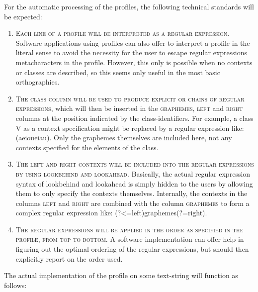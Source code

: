 For the automatic processing of the profiles, the following technical standards
will be expected:

\begin{enumerate}
	\def\labelenumi{\arabic{enumi}.} \item \textsc{Each line of a profile
	will be interpreted as a regular expression. }Software applications
	using profiles can also offer to interpret a profile in the literal
	sense to avoid the necessity for the user to escape regular expressions
	metacharacters in the profile. However, this only is possible when no
	contexts or classes are described, so this seems only useful in the most
	basic orthographies.  \item \textsc{The \textsc{class} column will be
	used to produce explicit \textsc{or} chains of regular expressions},
	which will then be inserted in the \textsc{graphemes}, \textsc{left} and
	\textsc{right} columns at the position indicated by the
	class-identifiers. For example, a class \textsc{V} as a context
	specification might be replaced by a regular expression like:
	(a\textbar{}e\textbar{}i\textbar{}o\textbar{}u\textbar{}ei\textbar{}au).
	Only the graphemes themselves are included here, not any contexts
	specified for the elements of the class.  \item \textsc{The
	\textsc{left} and \textsc{right} contexts will be included into the
	regular expressions by using lookbehind and lookahead}. Basically, the
	actual regular expression syntax of lookbehind and lookahead is simply
	hidden to the users by allowing them to only specify the contexts
	themselves. Internally, the contexts in the columns \textsc{left} and
	\textsc{right} are combined with the column \textsc{graphemes} to form a
	complex regular expression like: (?\textless{}=left)graphemes(?=right).
	\item \textsc{The regular expressions will be applied in the order as
	specified in the profile, from top to bottom.} A software implementation
	can offer help in figuring out the optimal ordering of the regular
	expressions, but should then explicitly report on the order used.
\end{enumerate}

The actual implementation of the profile on some text-string will function as
follows:

